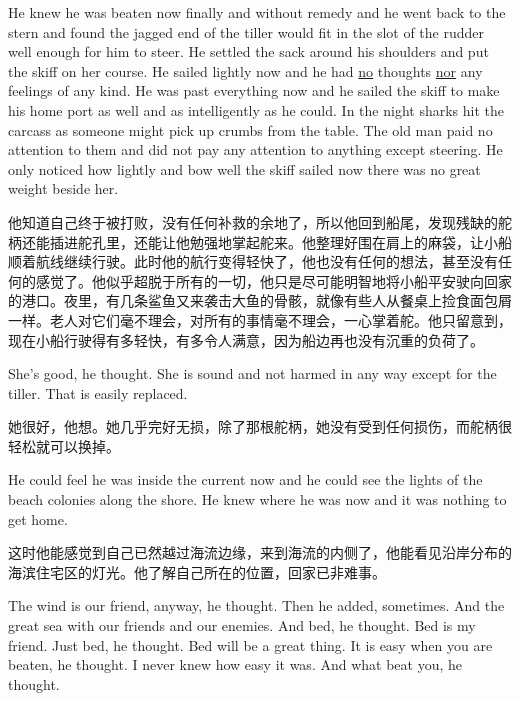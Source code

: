 \begin{paracol}{2}
\switchcolumn*

He knew he was beaten now finally and without \gls{remedy} and he went back
to the stern and found the \gls{jagged} end of the tiller would \gls{fit} in
the slot of the \gls{rudder} well enough for him to steer. He settled the
sack around his shoulders and put the skiff on her course. He sailed lightly
now and he had \uline{no} thoughts \uline{nor} any feelings of any kind. He was past
everything now and he sailed the skiff to make his home port as well and as
intelligently as he could. In the night sharks hit the carcass as someone
might pick up \glspl{crumb} from the table. The old man paid no attention to
them and did not pay any attention to anything except steering. He only
noticed how lightly and bow well the skiff sailed now there was no great
weight beside her.

\switchcolumn

他知道自己终于被打败，没有任何补救的余地了，所以他回到船尾，发现残缺的舵柄还能插进舵孔里，还能让他勉强地掌起舵来。他整理好围在肩上的麻袋，让小船顺着航线继续行驶。此时他的航行变得轻快了，他也没有任何的想法，甚至没有任何的感觉了。他似乎超脱于所有的一切，他只是尽可能明智地将小船平安驶向回家的港口。夜里，有几条鲨鱼又来袭击大鱼的骨骸，就像有些人从餐桌上捡食面包屑一样。老人对它们毫不理会，对所有的事情毫不理会，一心掌着舵。他只留意到，现在小船行驶得有多轻快，有多令人满意，因为船边再也没有沉重的负荷了。

\switchcolumn*

She's good, he thought. She is sound and not harmed in any way except for
the tiller. That is easily replaced.

\switchcolumn

她很好，他想。她几乎完好无损，除了那根舵柄，她没有受到任何损伤，而舵柄很轻松就可以换掉。

\switchcolumn*

He could feel he was inside the current now and he could see the lights of
the beach \gls{colonies} along the shore. He knew where he was now and it
was nothing to get home.

\switchcolumn

这时他能感觉到自己已然越过海流边缘，来到海流的内侧了，他能看见沿岸分布的海滨住宅区的灯光。他了解自己所在的位置，回家已非难事。

\switchcolumn*

The wind is our friend, anyway, he thought. Then he \gls{added},
sometimes. And the great sea with our friends and our enemies. And bed, he
thought. Bed is my friend. Just bed, he thought. Bed will be a great thing.
It is easy when you are beaten, he thought. I never knew how easy it was.
And what beat you, he thought.


\end{paracol}
